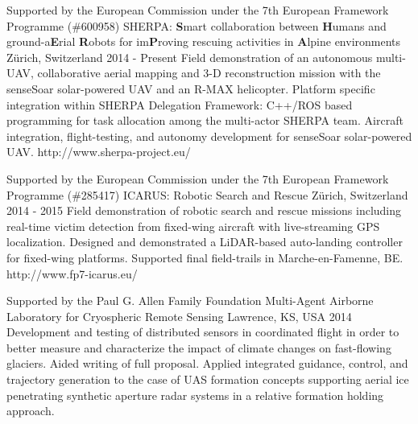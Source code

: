 \begin{cventries}
\begin{multicols}{2}
  \cvprojentry
    {Supported by the European Commission under the 7th European Framework Programme (\#600958)} %
    {SHERPA: \textbf{S}mart collaboration between \textbf{H}umans and ground-a\textbf{E}rial \textbf{R}obots for im\textbf{P}roving rescuing activities in \textbf{A}lpine environments} %
    {Z\"{u}rich, Switzerland} %
    {2014 - Present} %
    {Field demonstration of an autonomous multi-UAV, collaborative aerial mapping and 3-D reconstruction mission with the senseSoar solar-powered UAV and an R-MAX helicopter.} %
    {Platform specific integration within SHERPA Delegation Framework: C++/ROS based programming for task
allocation among the multi-actor SHERPA team. Aircraft integration, flight-testing, and autonomy development for senseSoar solar-powered UAV.} %
	{http://www.sherpa-project.eu/}

  \cvprojentry
    {Supported by the European Commission under the 7th European Framework Programme (\#285417)} %
    {ICARUS: Robotic Search and Rescue} %
    {Z\"{u}rich, Switzerland} %
    {2014 - 2015} %
    {Field demonstration of robotic search and rescue missions including real-time victim detection from fixed-wing aircraft with live-streaming GPS localization.} %
    {Designed and demonstrated a LiDAR-based auto-landing controller for fixed-wing platforms. Supported final field-trails in Marche-en-Famenne, BE.} %
    {http://www.fp7-icarus.eu/}
    
  \cvprojentry
    {Supported by the Paul G. Allen Family Foundation} %
    {Multi-Agent Airborne Laboratory for Cryospheric Remote Sensing} %
    {Lawrence, KS, USA} %
    {2014} %
    {Development and testing of distributed sensors in coordinated flight in order to better measure and characterize the impact of climate changes on fast-flowing glaciers.} %
    {Aided writing of full proposal. Applied integrated guidance, control, and trajectory generation to the case of UAS formation concepts supporting aerial ice penetrating synthetic aperture radar systems in a relative formation holding approach.} %
    {}
    

\end{multicols}
\end{cventries}
